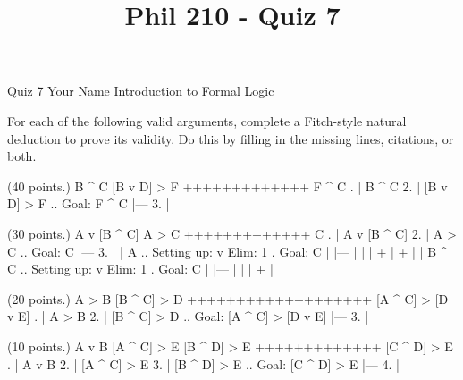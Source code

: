 
\title{Phil 210 - Quiz 7}

\heading
Quiz 7
Your Name
Introduction to Formal Logic
\endheading

For each of the following valid arguments, complete a Fitch-style natural deduction to prove its validity. Do this by filling in the missing lines, citations, or both.

\problems
{} (40 points.)
\argument
 B ^ C
 [B v D] > F
+++++++++++++
 F ^ C
\endargument
        \answer
        . | B ^ C
         2. | [B v D] > F  ..  Goal: F ^ C
            |---
         3. | 
        \endfitchproof
        \endanswer

 (30 points.)
\argument
 A v [B ^ C]
 A > C
+++++++++++++
 C
\endargument
        \answer
        . | A v [B ^ C]
         2. | A > C        ..  Goal: C
            |---
         3. |   | A        ..  Setting up: v Elim: 1  .  Goal: C
            |   |---
            |   | 
            |   + 
            |   + 
            |   | B ^ C    ..  Setting up: v Elim: 1  .  Goal: C
            |   |---
            |   |
            |   +
            | 
        \endfitchproof
        \endanswer

 (20 points.)
\argument
 A > B
 [B ^ C] > D
+++++++++++++++++++
 [A ^ C] > [D v E]
\endargument
        \answer
        . | A > B
         2. | [B ^ C] > D  ..  Goal: [A ^ C] > [D v E]
            |---
         3. | 
        \endfitchproof
        \endanswer

 (10 points.)
\argument
 A v B
 [A ^ C] > E
 [B ^ D] > E
+++++++++++++
 [C ^ D] > E
\endargument
        \answer
        . | A v B
         2. | [A ^ C] > E
         3. | [B ^ D] > E  ..  Goal: [C ^ D] > E
            |---
         4. | 
        \endfitchproof
        \endanswer

\endproblems
\bye

